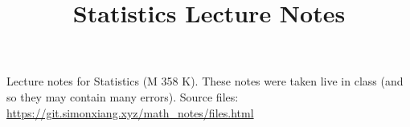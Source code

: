 \documentclass[fontsize=9pt]{article}
\title{Statistics Lecture Notes}
\date{}
\begin{document}
\maketitle
Lecture notes for Statistics (M 358 K). These notes were taken live in class (and so they may contain many errors). Source files: \url{https://git.simonxiang.xyz/math_notes/files.html}

\tableofcontents
\newpage
    
    
    
    
    
\end{document}

